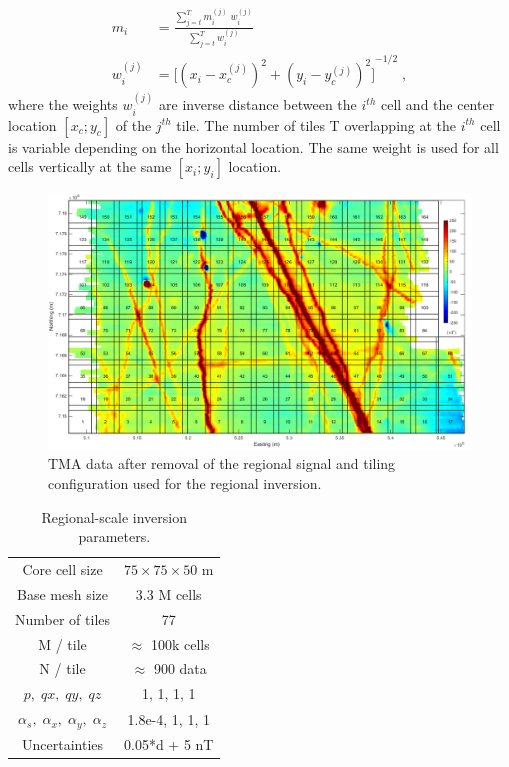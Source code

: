 \begin{equation}\label{merge}
\begin{split}
m_i &= \frac{\sum_{j=t}^T m_i^{(j)} \; w_i^{(j)}}{\sum_{j=t}^T w_i^{(j)}} \\
w_i^{(j)} & = {\Big[ { (x_i - x_c^{(j)})}^2 + { (y_i - y_c^{(j)})}^2 \Big]}^{-1/2} \;,
\end{split}
\end{equation}
where the weights $w_i^{(j)}$ are inverse distance between the $i^{th}$ cell and the center location $[x_c;y_c]$ of the $j^{th}$ tile. The number of tiles T overlapping at the $i^{th}$ cell is variable depending on the horizontal location. The same weight is used for all cells vertically at the same $[x_i;y_i]$ location.

\begin{figure}[h!]
\centering
\includegraphics[scale=0.38]{Ekati_Tiles.png}
\caption{TMA data after removal of the regional signal and tiling configuration used for the regional inversion.}
\label{fig:Ekati_Tiles}
\end{figure}

\begin{table}
\centering
\caption{Regional-scale inversion parameters.}
\label{tbl:Reg_inv}
\renewcommand{\arraystretch}{1.2}
\begin{tabular}{|c|c|}
Core cell size & $75\times75\times50$ m \\
Base mesh size & 3.3 M cells \\
Number of tiles & 77 \\
M / tile & $\approx$ 100k cells \\
N / tile & $\approx$ 900 data \\
$p,\;qx,\;qy,\;qz$ & 1, 1, 1, 1 \\
$\alpha_s,\; \alpha_x,\; \alpha_y, \; \alpha_z$ & 1.8e-4, 1, 1, 1 \\
Uncertainties & 0.05*d + 5 nT
\end{tabular}
\end{table}

